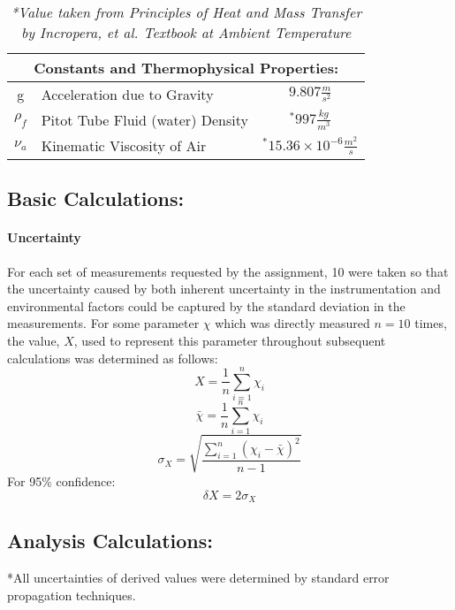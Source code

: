 \documentclass[12pt]{article}
\begin{document}
	\hfill\break\break
	\begin{table}
		\centering
		{
		\begin{tabular}{|c|l|c|}
		\hline
			\multicolumn{3}{|c|}{\textbf{Constants and Thermophysical Properties:}} \\
		\hline
		\hline
			g & Acceleration due to Gravity & $9.807\frac{m}{s^2}$\\
			$\rho_f$ & Pitot Tube Fluid (water) Density & $^*997\frac{kg}{m^3}$\\
			$\nu_a$ & Kinematic Viscosity of Air & $^*15.36\times10^{-6}\frac{m^2}{s}$\\
		\hline
		\end{tabular}
		}
		\caption*{\textit{*Value taken from \em{Principles of Heat and Mass Transfer by Incropera, et al.} Textbook at Ambient Temperature}}
	\end{table}


	\subsection{Basic Calculations:}
	\paragraph{Uncertainty} For each set of measurements requested by the assignment, 10 were taken so that the uncertainty caused by both inherent uncertainty in the instrumentation and environmental factors could be captured by the standard deviation in the measurements.\hfill\break 
	For some parameter $\chi$ which was directly measured $n=10$ times, the value, $X$, used to represent this parameter throughout subsequent calculations was determined as follows:
	\begin{equation}
		X = \frac{1}{n}\sum_{i=1}^{n}{\chi_i}
	\end{equation}
	$$\bar{\chi} = \frac{1}{n}\sum_{i=1}^{n}{\chi_i}$$
	$$\sigma_X = \sqrt{\frac{\sum_{i=1}^{n}{(\chi_i-\bar{\chi})^2}}{n-1}}$$
	For 95\% confidence:
	\begin{equation}
		\delta X = 2\sigma_X
	\end{equation}
	
	
	\subsection{Analysis Calculations:}
	*All uncertainties of derived values were determined by standard error propagation techniques.
\end{document}
